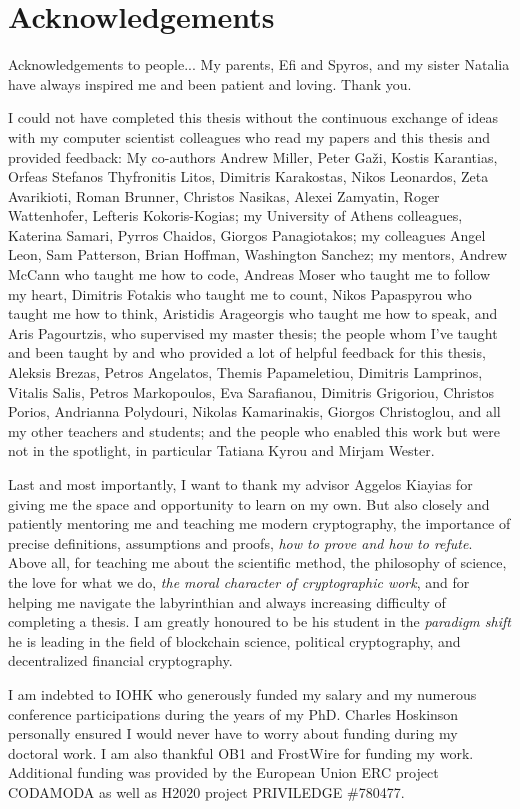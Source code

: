 \ifuniversity\else
\section*{Acknowledgements}
\fi
\ifdraft
Acknowledgements to people...
\else
My parents, Efi and Spyros, and my sister Natalia have always inspired me and
been patient and loving. Thank you.

I could not have completed this thesis without the continuous exchange of ideas
with my computer scientist colleagues who read my papers and this thesis and
provided feedback: My co-authors Andrew Miller, Peter Ga\v{z}i, Kostis
Karantias, Orfeas Stefanos Thyfronitis Litos, Dimitris Karakostas, Nikos
Leonardos, Zeta Avarikioti, Roman Brunner, Christos Nasikas,  Alexei Zamyatin,
Roger Wattenhofer, Lefteris Kokoris-Kogias; my University of Athens colleagues,
Katerina Samari, Pyrros Chaidos, Giorgos Panagiotakos; my colleagues Angel Leon,
Sam Patterson, Brian Hoffman, Washington Sanchez; my mentors, Andrew McCann who
taught me how to code, Andreas Moser who taught me to follow my heart, Dimitris
Fotakis who taught me to count, Nikos Papaspyrou who taught me how to think,
Aristidis Arageorgis who taught me how to speak, and Aris Pagourtzis, who
supervised my master thesis; the people whom I've taught and been taught by
and who provided a lot of helpful feedback for this thesis,
Aleksis Brezas, Petros Angelatos, Themis Papameletiou, Dimitris Lamprinos,
Vitalis Salis, Petros Markopoulos, Eva Sarafianou, Dimitris Grigoriou, Christos
Porios, Andrianna Polydouri, Nikolas Kamarinakis, Giorgos Christoglou, and all
my other teachers and students; and the people who enabled this work but were
not in the spotlight, in particular Tatiana Kyrou and Mirjam Wester.

Last and most importantly, I want to thank my advisor Aggelos Kiayias for
giving me the space and opportunity to learn on my own. But also closely and
patiently mentoring me and teaching me modern cryptography, the importance of
precise definitions, assumptions and proofs, \emph{how to prove and how to
refute}. Above all, for teaching me about the scientific method, the philosophy
of science, the love for what we do, \emph{the moral character of
cryptographic work}, and for helping me navigate the labyrinthian and
always increasing difficulty of completing a thesis. I am greatly
honoured to be his student in the \emph{paradigm shift} he is leading in the
field of blockchain science, political cryptography, and decentralized financial
cryptography.

I am indebted to IOHK who generously funded my salary and my numerous conference
participations during the years of my PhD. Charles Hoskinson personally ensured
I would never have to worry about funding during my doctoral work. I am also
thankful OB1 and FrostWire for funding my work. Additional funding was provided
by the European Union ERC project CODAMODA as well as H2020 project PRIVILEDGE
\#780477.
\fi
